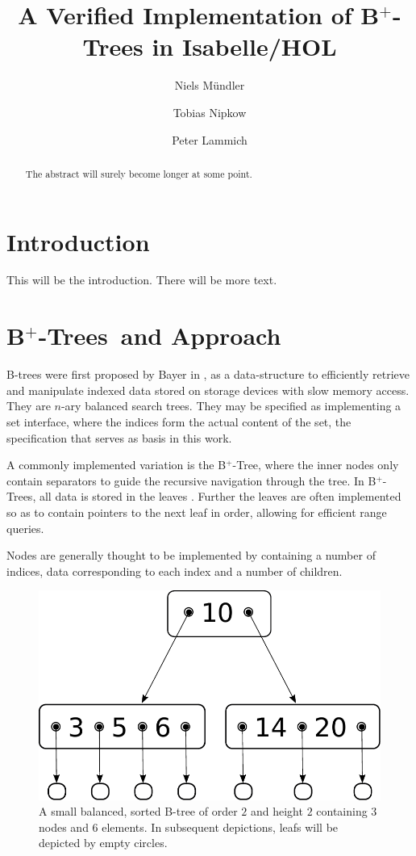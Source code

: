 \documentclass[a4paper,UKenglish,cleveref, autoref, thm-restate]{lipics-v2021}
\title{A Verified Implementation of B$^+$-Trees in Isabelle/HOL} %
\author{Niels Mündler}{Department of Computer Science, ETH Zurich, Switzerland}{n.muendler@tum.de}{https://orcid.org/0000-0003-3851-2557}{}%
\author{Tobias Nipkow}{Department of Informatics, Technical University of Munich, Germany}{nipkow@in.tum.de}{https://orcid.org/0000-0003-0730-515X}{}
\author{Peter Lammich}{Department of Computer Science, The University of Manchester, Great-Britain}{lammich@in.tum.de}{https://orcid.org/0000-0003-3576-0504}{}
\newcommand{\btree}{B$^+$-Tree}
\newcommand{\btrees}{B$^+$-Trees}
\begin{document}
\maketitle

\begin{abstract}
    The abstract will surely become longer at some point.
\end{abstract}

\section{Introduction}
\label{sec:introduction}

This will be the introduction. There will be more text.

\section{\btrees\ and Approach}
\label{sec:approach}

B-trees were first proposed by Bayer in \cite{DBLP:journals/acta/BayerM72},
as a data-structure to efficiently retrieve and manipulate
indexed data stored on storage devices with slow memory access.
They are $n$-ary balanced search trees.
They may be specified as implementing a set interface,
where the indices form the actual content of the set,
the specification that serves as basis in this work.

A commonly implemented variation is the \btree, where the inner nodes
only contain separators to guide the recursive navigation through the tree.
In \btrees, all data is stored in the leaves \cite{DBLP:journals/csur/Comer79}.
Further the leaves are often implemented so as to contain pointers
to the next leaf in order, allowing for efficient range queries.

Nodes are generally thought to be implemented by
containing a number of indices, data corresponding to each index
and a number of children.

\begin{figure}
    \centering
    \includegraphics[width=0.5\linewidth]{figures/btree-basic-nopair.pdf}
    \caption[A small example B-Tree]{A small balanced, sorted B-tree of order $2$ and
    height $2$ containing $3$ nodes and $6$ elements.
    In subsequent depictions, leafs will be depicted
    by empty circles.}
    \label{fig:btree-basic-nopair}
\end{figure}
\end{document}
